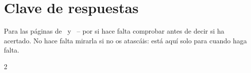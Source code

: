 \section*{Clave de respuestas}

Para las páginas de \lblAdivina\ y \lblRelaciona\ -- por si hace falta
comprobar antes de decir si ha acertado. No hace falta mirarla si no os
atascáis: está aquí solo para cuando haga falta.

\begin{multicols}{2}
\footnotesize
\begin{itemize}[leftmargin=0mm, label={}, itemsep=2mm, topsep=0mm]

\end{itemize}
\end{multicols}
\newpage
